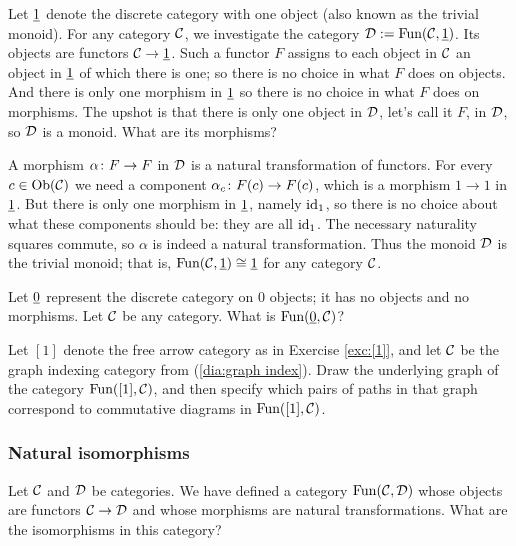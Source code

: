 \begin{example}

Let $\underline{1}$ denote the discrete category with one object (also known as the trivial monoid). For any category $\mathcal{C}$, we investigate the category $\mathcal{D}:=\textnormal{Fun}(\mathcal{C},\underline{1})$. Its objects are functors $\mathcal{C}\rightarrow\underline{1}$. Such a functor $F$ assigns to each object in $\mathcal{C}$ an object in $\underline{1}$ of which there is one; so there is no choice in what $F$ does on objects. And there is only one morphism in $\underline{1}$ so there is no choice in what $F$ does on morphisms. The upshot is that there is only one object in $\mathcal{D}$, let's call it $F$, in $\mathcal{D}$, so $\mathcal{D}$ is a monoid. What are its morphisms? 

A morphism $\alpha\colon F\rightarrow F$ in $\mathcal{D}$ is a natural transformation of functors. For every $c\in\textnormal{Ob}(\mathcal{C})$ we need a component $\alpha_c\colon F(c)\rightarrow F(c)$, which is a morphism $1\to 1$ in $\underline{1}$. But there is only one morphism in $\underline{1}$, namely $\textnormal{id}_1$, so there is no choice about what these components should be: they are all $\textnormal{id}_1$. The necessary naturality squares commute, so $\alpha$ is indeed a natural transformation. Thus the monoid $\mathcal{D}$ is the trivial monoid; that is, $\textnormal{Fun}(\mathcal{C},\underline{1})\cong\underline{1}$ for any category $\mathcal{C}$.

\end{example}

\begin{exercise}
Let $\underline{0}$ represent the discrete category on 0 objects; it has no objects and no morphisms. Let $\mathcal{C}$ be any category. What is $\textnormal{Fun}(\underline{0},\mathcal{C})$?
\end{exercise}

\begin{exercise}
Let $[1]$ denote the free arrow category as in Exercise \ref{exc:[1]}, and let $\mathcal{C}$ be the graph indexing category from (\ref{dia:graph index}). Draw the underlying graph of the category $\textnormal{Fun}([1],\mathcal{C})$, and then specify which pairs of paths in that graph correspond to commutative diagrams in $\textnormal{Fun}([1],\mathcal{C})$.
\end{exercise}


\subsubsection{Natural isomorphisms}

Let $\mathcal{C}$ and $\mathcal{D}$ be categories. We have defined a category $\textnormal{Fun}(\mathcal{C},\mathcal{D})$ whose objects are functors $\mathcal{C}\rightarrow\mathcal{D}$ and whose morphisms are natural transformations. What are the isomorphisms in this category? 

